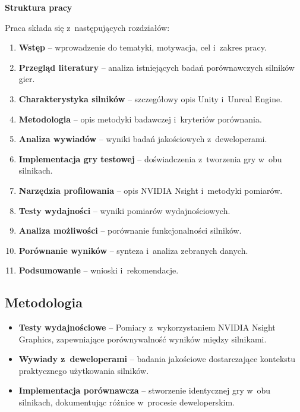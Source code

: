\textbf{Struktura pracy}

Praca składa się z~następujących rozdziałów:

\begin{enumerate}
    \item \textbf{Wstęp} -- wprowadzenie do tematyki, motywacja, cel i~zakres pracy.
    \item \textbf{Przegląd literatury} -- analiza istniejących badań porównawczych silników gier.
    \item \textbf{Charakterystyka silników} -- szczegółowy opis Unity i~Unreal Engine.
    \item \textbf{Metodologia} -- opis metodyki badawczej i~kryteriów porównania.
    \item \textbf{Analiza wywiadów} -- wyniki badań jakościowych z~deweloperami.
    \item \textbf{Implementacja gry testowej} -- doświadczenia z~tworzenia gry w~obu silnikach.
    \item \textbf{Narzędzia profilowania} -- opis NVIDIA Nsight i~metodyki pomiarów.
    \item \textbf{Testy wydajności} -- wyniki pomiarów wydajnościowych.
    \item \textbf{Analiza możliwości} -- porównanie funkcjonalności silników.
    \item \textbf{Porównanie wyników} -- synteza i~analiza zebranych danych.
    \item \textbf{Podsumowanie} -- wnioski i~rekomendacje.
\end{enumerate}

\subsection{Metodologia}

\begin{itemize}
    \item \textbf{Testy wydajnościowe} -- Pomiary z~wykorzystaniem NVIDIA Nsight Graphics, zapewniające porównywalność wyników między silnikami.
    \item \textbf{Wywiady z~deweloperami} -- badania jakościowe dostarczające kontekstu praktycznego użytkowania silników.
    \item \textbf{Implementacja porównawcza} -- stworzenie identycznej gry w~obu silnikach, dokumentując różnice w~procesie deweloperskim.
\end{itemize}

